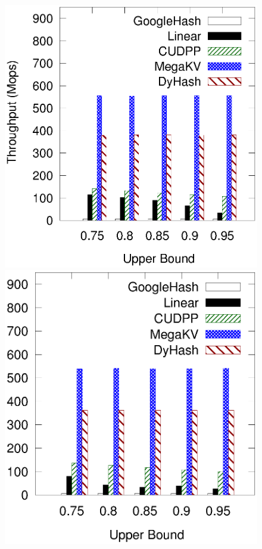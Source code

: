 \begin{figure}[t!]
	\begin{minipage}{0.19\linewidth}\centering
		\includegraphics[width=\linewidth]{pic/static-upper/upper_search_twitter.eps}
		\centerline{\dstwitter}
	\end{minipage}
	\hfill
	\begin{minipage}{0.19\linewidth}\centering
		\includegraphics[width=\linewidth]{pic/static-upper/upper_search_reddit.eps}

\end{minipage}
\end{figure}
